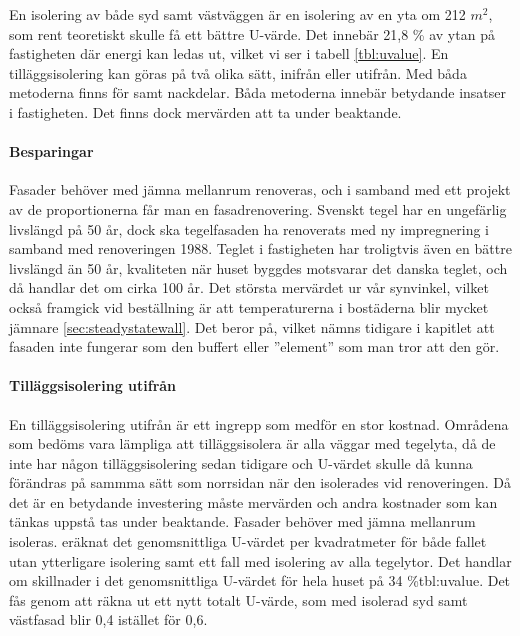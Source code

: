 En isolering av både syd samt västväggen är en isolering av en yta om 212 $\unit{m^2}$, som rent teoretiskt skulle få ett bättre U-värde. Det innebär 21,8 \% av ytan på fastigheten där energi kan ledas ut, vilket vi ser i tabell \ref{tbl:uvalue}.
En tilläggsisolering kan göras på två olika sätt, inifrån eller utifrån. Med båda metoderna finns för samt nackdelar. Båda metoderna innebär betydande insatser i fastigheten. Det finns dock mervärden att ta under beaktande. 

\paragraph{Besparingar}
Fasader behöver med jämna mellanrum renoveras, och i samband med ett projekt av de proportionerna får man en fasadrenovering. Svenskt tegel har en ungefärlig livslängd på 50 år\cite{magnus}, dock ska tegelfasaden ha renoverats med ny impregnering i samband med renoveringen 1988. Teglet i fastigheten har troligtvis även en bättre livslängd än 50 år, kvaliteten när huset byggdes motsvarar det danska teglet, och då handlar det om cirka 100 år. Det största mervärdet ur vår synvinkel, vilket också framgick vid beställning är att temperaturerna i bostäderna blir mycket jämnare \ref{sec:steadystatewall}. Det beror på, vilket nämns tidigare i kapitlet att fasaden inte fungerar som den buffert eller ”element” som man tror att den gör.

\paragraph{Tilläggsisolering utifrån}
En tilläggsisolering utifrån är ett ingrepp som medför en stor kostnad. Områdena som bedöms vara lämpliga att tilläggsisolera är alla väggar med tegelyta, då de inte har någon tilläggsisolering sedan tidigare och U-värdet skulle då kunna förändras på sammma sätt som norrsidan när den isolerades vid renoveringen. Då det är en betydande investering måste mervärden och andra kostnader som kan tänkas uppstå tas under beaktande. Fasader behöver med jämna mellanrum isoleras. eräknat det genomsnittliga U-värdet per kvadratmeter för både fallet utan ytterligare isolering samt ett fall med isolering av alla tegelytor. Det handlar om skillnader i det genomsnittliga U-värdet för hela huset på 34 \%{tbl:uvalue}. Det fås genom att räkna ut ett nytt totalt U-värde, som med isolerad syd samt västfasad blir 0,4 istället för 0,6.

